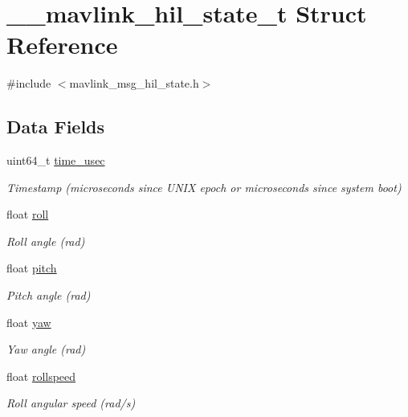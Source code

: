 \hypertarget{struct____mavlink__hil__state__t}{\section{\-\_\-\-\_\-mavlink\-\_\-hil\-\_\-state\-\_\-t Struct Reference}
\label{struct____mavlink__hil__state__t}
}


{\ttfamily \#include $<$mavlink\-\_\-msg\-\_\-hil\-\_\-state.\-h$>$}

\subsection*{Data Fields}
\begin{DoxyCompactItemize}
\item 
uint64\-\_\-t \hyperlink{struct____mavlink__hil__state__t_a19f9efdaaddd6d9699f8225bf5a4d4ef}{time\-\_\-usec}
\begin{DoxyCompactList}\small\item\em Timestamp (microseconds since U\-N\-I\-X epoch or microseconds since system boot) \end{DoxyCompactList}\item 
float \hyperlink{struct____mavlink__hil__state__t_a33202a922fda8d956b7ce78814d82558}{roll}
\begin{DoxyCompactList}\small\item\em Roll angle (rad) \end{DoxyCompactList}\item 
float \hyperlink{struct____mavlink__hil__state__t_a734b8ba645687e5673c599c4a9a950f1}{pitch}
\begin{DoxyCompactList}\small\item\em Pitch angle (rad) \end{DoxyCompactList}\item 
float \hyperlink{struct____mavlink__hil__state__t_aa7a7dfae39434c0c51492cb2d5614863}{yaw}
\begin{DoxyCompactList}\small\item\em Yaw angle (rad) \end{DoxyCompactList}\item 
float \hyperlink{struct____mavlink__hil__state__t_a308aa515448a4d8d25131ce7c0f3254d}{rollspeed}
\begin{DoxyCompactList}\small\item\em Roll angular speed (rad/s) \end{DoxyCompactList}\item 

\end{DoxyCompactItemize}

